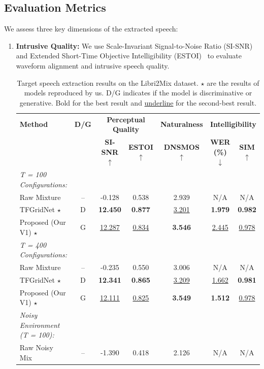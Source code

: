\documentclass[conference]{IEEEtran}
\begin{document}
\subsection{Evaluation Metrics}
We assess three key dimensions of the extracted speech:
\begin{enumerate}
    \item \textbf{Intrusive Quality:} We use Scale-Invariant Signal-to-Noise Ratio (SI-SNR)~\cite{sisnr} and Extended Short-Time Objective Intelligibility (ESTOI)~\cite{estoi} to evaluate waveform alignment and intrusive speech quality.
    \begin{table}[t]
\caption{Target speech extraction results on the Libri2Mix dataset. $\star$ are the results of models reproduced by us. D/G indicates if the model is discriminative or generative. Bold for the best result and \underline{underline} for the second-best result.}
\label{tab:results}
\begin{center}
\begin{tabular}{|l|c|cc|c|cc|}
\hline
\textbf{Method} & \textbf{D/G} & \multicolumn{2}{c|}{\textbf{Perceptual Quality}} & \textbf{Naturalness} & \multicolumn{2}{c|}{\textbf{Intelligibility}} \\
 & & \textbf{SI-SNR} $\uparrow$ & \textbf{ESTOI} $\uparrow$ & \textbf{DNSMOS} $\uparrow$ & \textbf{WER (\%)} $\downarrow$ & \textbf{SIM} $\uparrow$ \\
\hline
\textit{T = 100 Configurations:} & & & & & & \\
Raw Mixture & -- & -0.128 & 0.538 & 2.939 & N/A & N/A \\
TFGridNet $\star$ & D & \textbf{12.450} & \textbf{0.877} & \underline{3.201} & \textbf{1.979} & \textbf{0.982} \\
Proposed (Our V1) $\star$ & G & \underline{12.287} & \underline{0.834} & \textbf{3.546} & \underline{2.445} & \underline{0.978} \\
\hline
\textit{T = 400 Configurations:} & & & & & & \\
Raw Mixture & -- & -0.235 & 0.550 & 3.006 & N/A & N/A \\
TFGridNet $\star$ & D & \textbf{12.341} & \textbf{0.865} & \underline{3.209} & \underline{1.662} & \textbf{0.981} \\
Proposed (Our V1) $\star$ & G & \underline{12.111} & \underline{0.825} & \textbf{3.549} & \textbf{1.512} & \underline{0.978} \\
\hline
\textit{Noisy Environment (T = 100):} & & & & & & \\
Raw Noisy Mix & -- & -1.390 & 0.418 & 2.126 & N/A & N/A \\

\end{tabular}
\end{center}
\end{table}
\end{enumerate}
\end{document}
